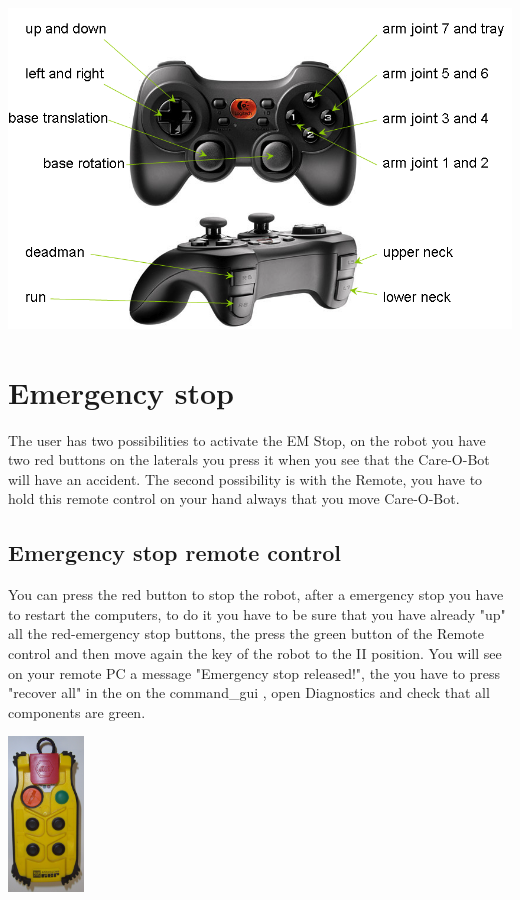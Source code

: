 \begin{center}
\includegraphics[width=1\textwidth]{images/joystick.png}
\end{center}

\section{Emergency stop} 
The user has two possibilities to activate the EM Stop, on the robot you have two red buttons on the laterals you press it when you see that the Care-O-Bot will have an accident. The second possibility is with the Remote, you have to hold this remote control on your hand always that you move Care-O-Bot. 
\subsection{Emergency stop remote control}

You can press the red button to stop the robot, after a emergency stop you have to restart the computers, to do it you have to be sure that you have already "up" all the red-emergency stop buttons, the press the green button of the Remote control and then move again the key of the robot to the II position. You will see on your remote PC a message "Emergency stop released!", the you have to press "recover all" in the on the command\_gui , open Diagnostics and check that all components are green. 

\begin{center}
\includegraphics[width=0.15\textwidth]{images/em_stop.png}
\end{center}

